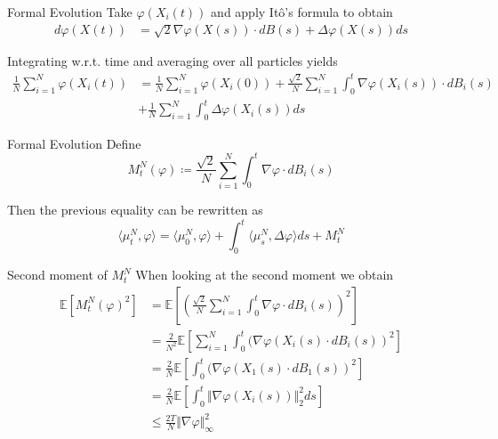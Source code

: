 \documentclass{beamer}
\newcommand{\E}{\mathbb{E}}
\begin{document}
    \begin{frame}{Formal Evolution}
        Take $\varphi(X_i(t))$ and apply Itô's formula to obtain
        \begin{align*}
            d\varphi(X(t))
            &= \sqrt2\nabla\varphi(X(s))\cdot dB(s) + \Delta\varphi(X(s))ds
        \end{align*}

        \pause
        Integrating w.r.t. time and averaging over all particles yields
        \begin{align*}
            \frac{1}{N}\sum_{i=1}^N\varphi(X_i(t))
            &= \frac{1}{N}\sum_{i=1}^N\varphi(X_i(0))
            + \frac{\sqrt2}{N}\sum_{i=1}^N\int_0^t\nabla\varphi(X_i(s))\cdot dB_i(s)\\
            &+ \frac{1}{N}\sum_{i=1}^N\int_0^t\Delta\varphi(X_i(s))ds
        \end{align*}
    \end{frame}

    \begin{frame}{Formal Evolution}
        Define
        \begin{equation*}
            M_t^N(\varphi)
            \coloneq
            \frac{\sqrt 2}{N}\sum_{i=1}^N\int_0^t\nabla\varphi\cdot dB_i(s)
        \end{equation*}
    
        \pause
        Then the previous equality can be rewritten as
        \begin{equation*}
            \langle\mu_t^N, \varphi\rangle = \langle\mu_0^N, \varphi\rangle
            +\int_0^t\langle\mu_s^N,\Delta\varphi\rangle ds + M_t^N
        \end{equation*}
    \end{frame}

    \begin{frame}{Second moment of $M_t^N$}
        When looking at the second moment we obtain
        \begin{align*}
            \E[M_t^N(\varphi)^2]
            &= \E\left[\left(
            \frac{\sqrt 2}{N}\sum_{i=1}^N\int_0^t\nabla\varphi\cdot dB_i(s)
            \right)^2\right]\\
            &= \frac{2}{N^2}\E\left[
            \sum_{i=1}^N\int_0^t(\nabla\varphi(X_i(s)\cdot dB_i(s))^2\right]\\
            &= \frac{2}{N}\E\left[
            \int_0^t(\nabla\varphi(X_1(s)\cdot dB_1(s))^2\right]\\
            &= \frac{2}{N}\E\left[\int_0^t\Vert\nabla\varphi(X_i(s))\Vert_2^2ds\right]\\
            &\leq\frac{2T}{N}\Vert\nabla\varphi\Vert_\infty^2
        \end{align*}
    \end{frame}
\end{document}
